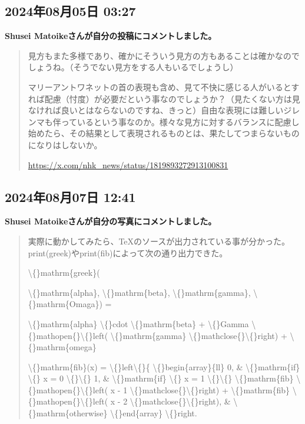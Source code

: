 \subsection*{2024年08月05日 03:27}

\textbf{Shusei Matoikeさんが自分の投稿にコメントしました。}

\begin{quote}
見方もまた多様であり、確かにそういう見方の方もあることは確かなのでしょうね。（そうでない見方をする人もいるでしょうし）

マリーアントワネットの首の表現も含め、見て不快に感じる人がいるとすれば配慮（忖度）が必要だという事なのでしょうか？（見たくない方は見なければ良いとはならないのですね、きっと）自由な表現には難しいジレンマも伴っているという事なのか。様々な見方に対するバランスに配慮し始めたら、その結果として表現されるものとは、果たしてつまらないものになりはしないか。

\url{https://x.com/nhk_news/status/1819893272913100831}
\end{quote}

\subsection*{2024年08月07日 12:41}

\textbf{Shusei Matoikeさんが自分の写真にコメントしました。}

\begin{quote}
実際に動かしてみたら、TeXのソースが出力されている事が分かった。 print(greek)やprint(fib)によって次の通り出力できた。

\textbackslash\{\}mathrm\{greek\}(

\textbackslash\{\}mathrm\{alpha\}, \textbackslash\{\}mathrm\{beta\}, \textbackslash\{\}mathrm\{gamma\}, \textbackslash\{\}mathrm\{Omaga\}) =

\textbackslash\{\}mathrm\{alpha\} \textbackslash\{\}cdot \textbackslash\{\}mathrm\{beta\} + \textbackslash\{\}Gamma \textbackslash\{\}mathopen\{\}\textbackslash\{\}left( \textbackslash\{\}mathrm\{gamma\} \textbackslash\{\}mathclose\{\}\textbackslash\{\}right) + \textbackslash\{\}mathrm\{omega\}

\textbackslash\{\}mathrm\{fib\}(x) = \textbackslash\{\}left\textbackslash\{\}\{ \textbackslash\{\}begin\{array\}\{ll\} 0, \& \textbackslash\{\}mathrm\{if\} \textbackslash\{\} x = 0 \textbackslash\{\}\textbackslash\{\} 1, \& \textbackslash\{\}mathrm\{if\} \textbackslash\{\} x = 1 \textbackslash\{\}\textbackslash\{\} \textbackslash\{\}mathrm\{fib\} \textbackslash\{\}mathopen\{\}\textbackslash\{\}left( x - 1 \textbackslash\{\}mathclose\{\}\textbackslash\{\}right) + \textbackslash\{\}mathrm\{fib\} \textbackslash\{\}mathopen\{\}\textbackslash\{\}left( x - 2 \textbackslash\{\}mathclose\{\}\textbackslash\{\}right), \& \textbackslash\{\}mathrm\{otherwise\} \textbackslash\{\}end\{array\} \textbackslash\{\}right.
\end{quote}


